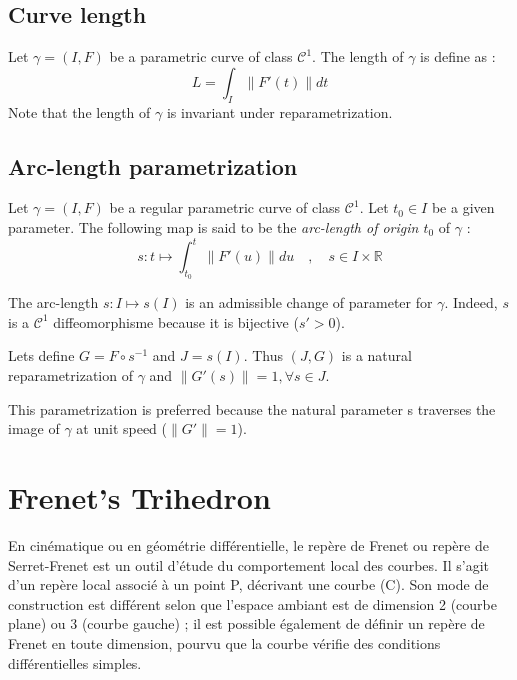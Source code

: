 \subsection{Curve length}
Let $\gamma=(I,F)$ be a parametric curve of class ${\mathcal{C}}^{1}$. The length of $\gamma$ is define as : 
\begin{equation}
L=\int_{I}\|F'(t)\|dt
\end{equation}
Note that the length of $\gamma$ is invariant under reparametrization.

\subsection{Arc-length parametrization}
Let $\gamma=(I,F)$ be a regular parametric curve of class ${\mathcal{C}}^{1}$. Let $t_0 \in I$ be a given parameter. The following map is said to be the \emph{arc-length of origin $t_0$} of $\gamma$ :
\begin{equation}
s \colon t \mapsto \int_{t_{0}}^{t}\|F'(u)\|du
\quad,\quad
s \in I \times \mathbb{R}
\end{equation}

The arc-length $s\colon I\mapsto s(I)$ is an admissible change of parameter for $\gamma$. Indeed, $s$ is a ${\mathcal{C}}^{1}$ diffeomorphisme because it is bijective ($s'>0$).

Lets define $G=F\circ s^{-1}$ and $J=s(I)$. Thus $(J,G)$ is a natural reparametrization of $\gamma$ and  $\|G'(s)\| = 1, \forall s \in J$.

This parametrization is preferred because the natural parameter s traverses the image of $\gamma$ at unit speed ($\|G'\| = 1$).




\section{Frenet's Trihedron}
\label{sec:frenet}
En cinématique ou en géométrie différentielle, le repère de Frenet ou repère de Serret-Frenet est un outil d'étude du comportement local des courbes. Il s'agit d'un repère local associé à un point P, décrivant une courbe (C). Son mode de construction est différent selon que l'espace ambiant est de dimension 2 (courbe plane) ou 3 (courbe gauche) ; il est possible également de définir un repère de Frenet en toute dimension, pourvu que la courbe vérifie des conditions différentielles simples.


